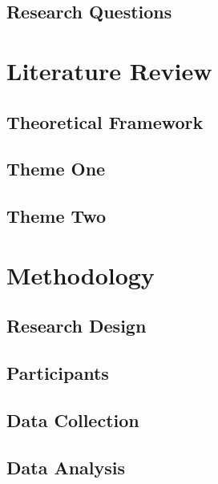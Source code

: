 \documentclass[12pt, a4paper]{article}
\begin{document}
\subsection{Research Questions}

\section{Literature Review}

\subsection{Theoretical Framework}

\subsection{Theme One}

\subsection{Theme Two}

\section{Methodology}

\subsection{Research Design}

\subsection{Participants}

\subsection{Data Collection}

\subsection{Data Analysis}
\end{document}
